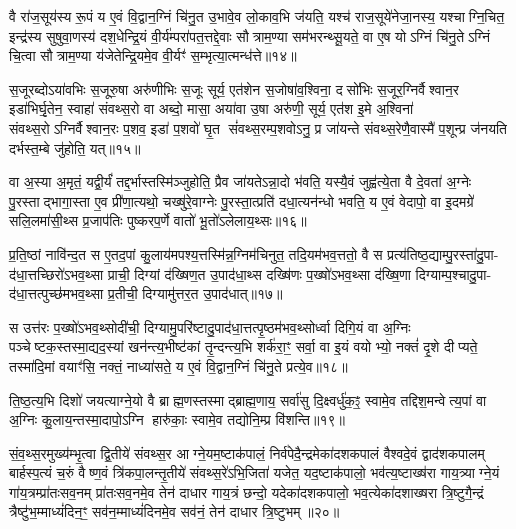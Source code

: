 वै रा॑ज॒सूय॑स्य रू॒पं य ए॒वं वि॒द्वान॒ग्निं चि॑नु॒त उ॒भावे॒व लो॒काव॒भि ज॑यति॒ यश्च॑ राज॒सूये॑नेजा॒नस्य॒ यश्चाग्नि॒चित॒ इन्द्र॑स्य सुषुवा॒णस्य॑ दश॒धेन्द्रि॒यं वी॒र्य॑म्परा॑पत॒त्तद्दे॒वाः सौत्राम॒ण्या सम॑भरन्थ्सू॒यते॒ वा ए॒ष योऽग्निं चि॑नु॒तेऽग्निं चि॒त्वा सौत्राम॒ण्या य॑जेतेन्द्रि॒यमे॒व वी॒र्यꣳ॑ स॒म्भृत्या॒त्मन्ध॑त्ते॥१४॥

{\anuvakamend[{त ए॒वान्वव॑स्रावयत्ये॒तद॒ष्टाच॑त्वारिशच्च॥३॥}]}

स॒जूरब्दोऽया॑वभिः स॒जूरु॒षा अरु॑णीभिः स॒जूः सूर्य॒ एत॑शेन स॒जोषा॑व॒श्विना॒ दसो॑भिः स॒जूर॒ग्निर्वैश्वान॒र इडा॑भिर्घृ॒तेन॒ स्वाहा॑ संवथ्स॒रो वा अब्दो॒ मासा॒ अया॑वा उ॒षा अरु॑णी॒ सूर्य॒ एत॑श इ॒मे अ॒श्विना॑ संवथ्स॒रोऽग्निर्वैश्वान॒रः प॒शव॒ इडा॑ प॒शवो॑ घृ॒त सं॑वथ्स॒रम्प॒शवोऽनु॒ प्र जा॑यन्ते संवथ्स॒रेणै॒वास्मै॑ प॒शून्प्र ज॑नयति दर्भस्त॒म्बे जु॑होति॒ यत्॥१५॥

वा अ॒स्या अ॒मृतं॒ यद्वी॒र्यं॑ तद्द॒र्भास्तस्मि॑ञ्जुहोति॒ प्रैव जा॑यतेऽन्ना॒दो भ॑वति॒ यस्यै॒वं जुह्व॑त्ये॒ता वै दे॒वता॑ अ॒ग्नेः पु॒रस्ताद्भागा॒स्ता ए॒व प्री॑णा॒त्यथो॒ चख्षु॑रे॒वाग्नेः पु॒रस्ता॒त्प्रति॑ दधा॒त्यन॑न्धो भवति॒ य ए॒वं वेदापो॒ वा इ॒दमग्रे॑ सलि॒लमा॑सी॒थ्स प्र॒जाप॑तिः पुष्करप॒र्णे वातो॑ भू॒तो॑ऽलेलाय॒थ्सः॥१६॥

प्र॒ति॒ष्ठां नावि॑न्द॒त स ए॒तद॒पां कु॒लाय॑मपश्य॒त्तस्मि॑न्न॒ग्निम॑चिनुत॒ तदि॒यम॑भव॒त्ततो॒ वै स प्रत्य॑तिष्ठ॒द्याम्पु॒रस्ता॑दु॒पा- द॑धा॒त्तच्छिरो॑ऽभव॒थ्सा प्राची॒ दिग्यां द॑ख्षिण॒त उ॒पाद॑धा॒थ्स दख्षि॑णः प॒ख्षो॑ऽभव॒थ्सा द॑ख्षि॒णा दिग्याम्प॒श्चादु॒पा- द॑धा॒त्तत्पुच्छ॑मभव॒थ्सा प्र॒तीची॒ दिग्यामु॑त्तर॒त उ॒पाद॑धात्॥१७॥

स उत्त॑रः प॒ख्षो॑ऽभव॒थ्सोदी॑ची॒ दिग्यामु॒परि॑ष्टादु॒पाद॑धा॒त्तत्पृ॒ष्ठम॑भव॒थ्सोर्ध्वा दिगि॒यं वा अ॒ग्निः पञ्चेष्टक॒स्तस्मा॒द्यद॒स्यां खन॑न्त्य॒भीष्ट॑कां तृ॒न्दन्त्य॒भि शर्क॑रा॒ꣳ॒ सर्वा॒ वा इ॒यं वयोभ्यो॒ नक्तं॑ दृ॒शे दीप्यते॒ तस्मा॑दि॒मां वयाꣳ॑सि॒ नक्तं॒ नाध्या॑सते॒ य ए॒वं वि॒द्वान॒ग्निं चि॑नु॒ते प्रत्ये॒व॥१८॥

ति॒ष्ठ॒त्य॒भि दिशो॑ जयत्याग्ने॒यो वै ब्राह्म॒णस्तस्माद्ब्राह्म॒णाय॒ सर्वा॑सु दि॒क्ष्वर्धु॑क॒ꣵ॒ स्वामे॒व तद्दिश॒मन्वेत्य॒पां वा अ॒ग्निः कु॒लाय॒न्तस्मा॒दापो॒ऽग्नि हारु॑काः॒ स्वामे॒व तद्योनि॒म्प्र वि॑शन्ति॥१९॥

{\anuvakamend[{यद॑लेलाय॒थ्स उ॑त्तर॒त उ॒पाद॑धादे॒व द्वात्रिꣳ॑शच्च॥४॥}]}

सं॒व॒थ्स॒रमुख्य॑म्भृ॒त्वा द्वि॒तीये॑ संवथ्स॒र आग्ने॒यम॒ष्टाक॑पालं॒ निर्व॑पेदै॒न्द्रमेका॑दशकपालं वैश्वदे॒वं द्वाद॑शकपालम् बार्\mbox{}हस्प॒त्यं च॒रुं वैष्ण॒वं त्रि॑कपा॒लन्तृ॒तीये॑ संवथ्स॒रे॑ऽभि॒जिता॑ यजेत॒ यद॒ष्टाक॑पालो॒ भव॑त्य॒ष्टाख्ष॑रा गाय॒त्र्याग्ने॒यं गा॑य॒त्रम्प्रा॑तःसव॒नम् प्रा॑तःसव॒नमे॒व तेन॑ दाधार गाय॒त्रं छन्दो॒ यदेका॑दशकपालो॒ भव॒त्येका॑दशाख्षरा त्रि॒ष्टुगै॒न्द्रं त्रैष्टु॑भ॒म्माध्यं॑दिन॒ꣳ॒ सव॑न॒म्माध्यं॑दिनमे॒व सव॑नं॒ तेन॑ दाधार त्रि॒ष्टुभम्॥२०॥

